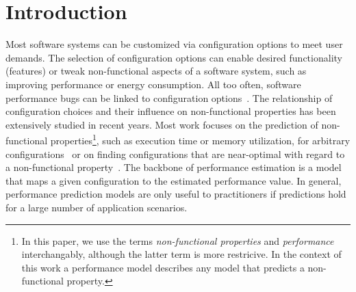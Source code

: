 \section{Introduction}
Most software systems can be customized via configuration options to meet user demands. The selection of configuration options can enable desired functionality (features) or tweak non-functional aspects of a software system, such as improving performance or energy consumption. 
All too often, software performance bugs can be linked to configuration options~\cite{han_empirical_2016}. 
The relationship of configuration choices and their influence on non-functional properties has been extensively studied in recent years. Most work focuses on the prediction of non-functional properties\footnote{In this paper, we use the terms \textit{non-functional properties} and \textit{performance} interchangably, although the latter term is more restricive. In the context of this work a performance model describes any model that predicts a non-functional property.}, such as execution time or memory utilization, for arbitrary configurations~\cite{dorn2020,siegmundPerformanceinfluenceModelsHighly2015,haDeepPerf2019,perfAL,guoVariabilityawarePerformancePrediction2013,sarkarCostEfficientSamplingPerformance,guo_2018_data,fourier_learning_2015,perLasso} or on finding configurations that are near-optimal with regard to a non-functional property~\cite{nairUsingBadLearners2017,nairFlash18,ohFindingNearoptimalConfigurations2017}. 
The backbone of performance estimation is a model that maps a given configuration to the estimated performance value. 
In general, performance prediction models are only useful to practitioners if predictions hold for a large number of application scenarios.

